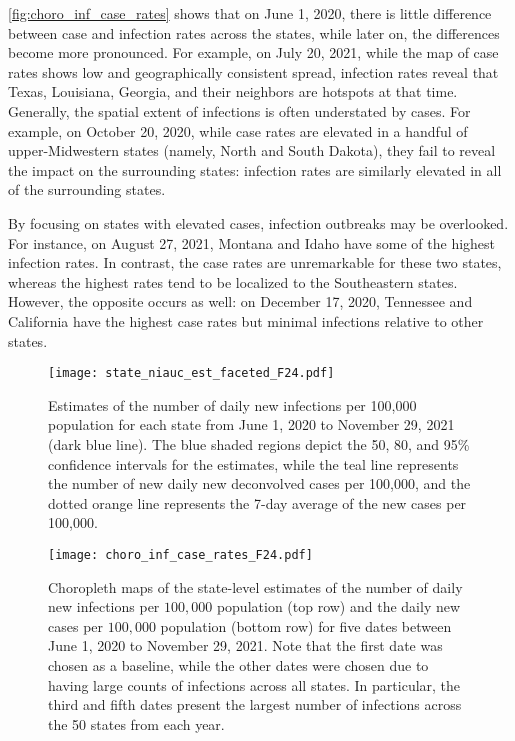 \autoref{fig:choro_inf_case_rates} shows that on June 1, 2020, there is little
difference between case and infection rates across the states, while
later on, the differences become more pronounced.
For example, on July 20, 2021, while the map of case rates shows low and
geographically consistent spread, infection rates reveal that Texas, Louisiana,
Georgia, and their neighbors are hotspots at that time. Generally, the spatial
extent of infections is often understated by cases. For example, on October 20,
2020, while case rates are elevated in a handful of upper-Midwestern states
(namely, North and South Dakota), they fail to reveal the impact on the
surrounding states: infection rates are similarly elevated in all of the
surrounding states. 

By focusing on states with elevated cases, infection outbreaks may be
overlooked. For instance, on August 27, 2021, Montana and Idaho have some of the
highest infection rates. In contrast, the case rates are unremarkable for these
two states, whereas the highest rates tend to be localized to the Southeastern
states. However, the opposite occurs as well: on December
17, 2020, Tennessee and California have the highest case rates but minimal
infections relative to other states.

\begin{figure}[!tb]
\centering
\texttt{[image: state\_niauc\_est\_faceted\_F24.pdf]} 
\caption{Estimates of the number of daily new infections per 100,000
population for each \US state from June 1, 2020 to November 29, 2021
(dark blue line). The blue shaded regions depict the 50, 80, and 95\%
confidence intervals for the estimates, while the teal line represents
the number of new daily new deconvolved cases per 100,000, and the
dotted orange line represents the 7-day average of the new cases per
100,000.}
\label{fig:state_infect_est}
\end{figure}


\begin{figure}[!tb]
\centering
\texttt{[image: choro\_inf\_case\_rates\_F24.pdf]}
\caption{Choropleth maps of the state-level estimates of the number of daily new
infections per $100,000$ population (top row) and the daily new cases per
$100,000$ population (bottom row) for five dates between June 1, 2020 to
November 29, 2021. Note that the first date was chosen as a baseline, while the
other dates were chosen due to having large counts of infections across all
states. In particular, the third and fifth dates present the largest number of
infections across the 50 states from each year.} 
\label{fig:choro_inf_case_rates}
\end{figure}    



